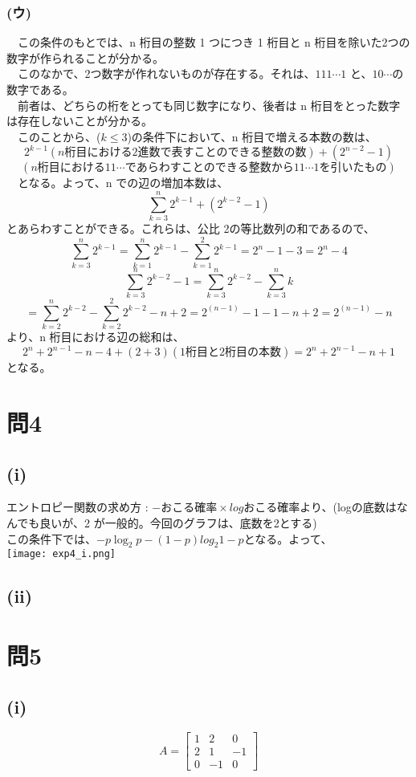 \documentclass[10pt]{jarticle}
\begin{document}
\subsubsection*{(ウ)}
　この条件のもとでは、n 桁目の整数 1 つにつき 1 桁目と n 桁目を除いた2つの数字が作られることが分かる。\\
　このなかで、2つ数字が作れないものが存在する。それは、$111 \cdots 1$ と、$10 \cdots $の数字である。\\
　前者は、どちらの桁をとっても同じ数字になり、後者は n 桁目をとった数字は存在しないことが分かる。\\
　このことから、($k \leq 3$)の条件下において、n 桁目で増える本数の数は、
\[
2^{k - 1}(n桁目における2進数で表すことのできる整数の数) + (2^{n - 2} - 1)
\]
\[
(n桁目における11 \cdots であらわすことのできる整数から11 \cdots 1を引いたもの)
\]
　となる。よって、n での辺の増加本数は、
\[
\sum^{n}_{k = 3}{2^{k - 1} + (2^{k - 2} - 1) }
\]
とあらわすことができる。これらは、公比 2の等比数列の和であるので、
\[
\sum^n_{k = 3}2^{k - 1} = \sum^n_{k = 1}2^{k - 1} - \sum^2_{k = 1}2^{k - 1} = 2^n - 1 - 3 = 2^n - 4
\]
\[
\sum^n_{k = 3}{2^{k - 2} - 1} = \sum^n_{k = 3}2^{k - 2} - \sum^n_{k = 3}k
\]
\[
= \sum^n_{k = 2}{2^{k - 2}} - \sum^2_{k = 2}2^{k - 2} - n + 2 = 2^(n - 1) - 1 - 1 - n + 2 = 2^(n - 1) - n
\]
より、n 桁目における辺の総和は、
\[
2^n + 2^{n - 1} - n - 4 + (2 + 3)( 1 桁目と 2 桁目の本数) = 2^n + 2^{n - 1} - n + 1
\]
となる。
\\
\section*{問4}
\subsection*{(i)}
エントロピー関数の求め方 : $-おこる確率 \times log{おこる確率}$より、(logの底数はなんでも良いが、2 が一般的。今回のグラフは、底数を2とする)\\
この条件下では、$-p\log_2{p} - (1 - p)log_2{1 - p}$となる。よって、\\
\texttt{[image: exp4\_i.png]}\\
\subsection*{(ii)}

\section*{問5}
\subsection*{(i)}
\[
A = 
\left[
\begin{array}{ccc}
1 & 2 & 0 \\
2 & 1 & -1 \\
0 & -1 & 0
\end{array}
\right]
\]
\end{document}
